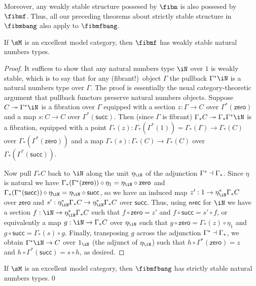 \documentclass{amsart}
\let\N\iN
\def\zero{\mathsf{zero}}
\def\succ{\mathsf{succ}}
\def\nrec{\mathsf{nrec}}
\begin{document}
Moreover, any weakly stable structure possesed by $\fibm$ is also possesed by $\fibmf$.
Thus, all our preceding theorems about strictly stable structure in $\fibmbang$ also apply to $\fibmfbang$.

\begin{thm}\label{thm:nat-stable}
  If $\sM$ is an excellent model category, then $\fibmf$ has weakly stable natural numbers types.
\end{thm}
\begin{proof}
  It suffices to show that any natural numbers type $\N$ over $1$ is weakly stable, which is to say that for any (fibrant!)\ object $\Gamma$ the pullback $\Gamma^* \N$ is a natural numbers type over $\Gamma$.
  The proof is essentially the usual category-theoretic argument that pullback functors preserve natural numbers objects.
  Suppose $C\fib \Gamma^* \N$ is a fibration over $\Gamma$ equipped with a section $z:\Gamma\to C$ over $\Gamma^*(\zero)$ and a map $s:C\to C$ over $\Gamma^*(\succ)$.
  Then (since $\Gamma$ is fibrant) $\Gamma_* C \fib \Gamma_* \Gamma^* \N$ is a fibration, equipped with a point $\Gamma_*(z) : \Gamma_*(\Gamma^*(1)) = \Gamma_*(\Gamma) \to \Gamma_*(C)$ over $\Gamma_*(\Gamma^*(\zero))$ and a map $\Gamma_*(s):\Gamma_*(C)\to\Gamma_*(C)$ over $\Gamma_*(\Gamma^*(\succ))$.

  Now pull $\Gamma_* C$ back to $\N$ along the unit $\eta_\N$ of the adjunction $\Gamma^* \dashv \Gamma_*$.
  Since $\eta$ is natural we have $\Gamma_*(\Gamma^*(\zero)) \circ \eta_1 = \eta_\N \circ \zero$ and $\Gamma_*(\Gamma^*(\succ)) \circ \eta_\N = \eta_\N \circ \succ$, so we have an induced map $z' : 1 \to \eta_\N^*\Gamma_*C$ over $\zero$ and $s':\eta_\N^*\Gamma_*C \to \eta_\N^*\Gamma_*C$ over $\succ$.
  Thus, using $\nrec$ for $\N$ we have a section $f:\N\to \eta_\N^*\Gamma_* C$ such that $f \circ \zero = z'$ and $f\circ \succ = s' \circ f$, or equivalently a map $g:\N \to \Gamma_*C$ over $\eta_\N$ such that $g\circ \zero = \Gamma_*(z) \circ \eta_1$ and $g\circ \succ = \Gamma_*(s) \circ g$.
  Finally, transposing $g$ across the adjunction $\Gamma^* \dashv \Gamma_*$, we obtain $\Gamma^* \N \to C$ over $1_\N$ (the adjunct of $\eta_\N$) such that $h\circ \Gamma^*(\zero) = z$ and $h\circ \Gamma^*(\succ) = s\circ h$, as desired.
\end{proof}

\begin{cor}
  If $\sM$ is an excellent model category, then $\fibmfbang$ has strictly stable natural numbers types.\qed
\end{cor}
\end{document}
